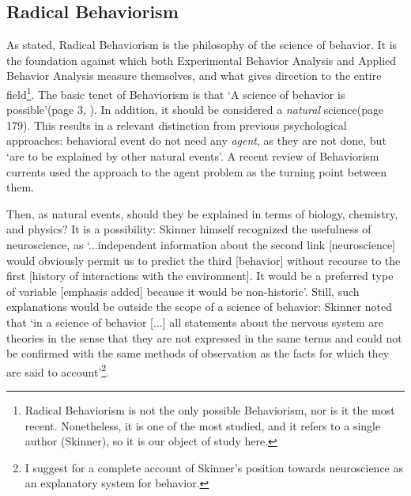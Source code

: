 \documentclass[letterpaper,11pt,twocolumn]{article}
\begin{document}
\subsection*{Radical Behaviorism}
As stated, Radical Behaviorism is the philosophy of the science of behavior. It is the foundation against which both Experimental Behavior Analysis and Applied Behavior Analysis measure themselves, and what gives direction to the entire field\footnote{Radical Behaviorism is not the only possible Behaviorism, nor is it the most recent. Nonetheless, it is one of the most studied, and it refers to a single author (Skinner), so it is our object of study here.}. The basic tenet of Behaviorism is that \enquote*{A science of behavior is possible}(page 3, \cite{baumUnderstandingBehaviorismBehavior2017}). In addition, it should be considered a \textit{natural} science\cite{baumWhatRadicalBehaviorism2011}\cite{chiesaRadicalBehaviorismPhilosophy1994}(page 179). This results in a relevant distinction from previous psychological approaches: behavioral event do not need any \textit{agent}, as they are not done, but \enquote*{are to be explained by other natural events}\cite{baumWhatRadicalBehaviorism2011}.
A recent review\cite{araibaCurrentDiversificationBehaviorism2020} of Behaviorism currents used the approach to the agent problem as the turning point between them.

Then, as natural events, should they be explained in terms of biology, chemistry, and physics? It is a possibility: Skinner himself recognized the usefulness of neuroscience, as \enquote*{...independent information about the second link [neuroscience] would obviously permit us to predict the third [behavior] without recourse to the first [history of interactions with the environment]. It would be a preferred type of variable [emphasis added] because it would be non-historic}\cite{skinnerScienceHumanBehavior1953}.
Still, such explanations would be outside the scope of a science of behavior: Skinner noted that \enquote*{in a science of behavior [...] all statements about the nervous system are theories in the sense that they are not expressed in the same terms and could not be confirmed with the same methods of observation as the facts for which they are said to account}\cite{skinnerAreTheoriesLearning1950}\footnote{I suggest \cite{zilioWhoWhatWhen2016} for a complete account of Skinner's position towards neuroscience as an explanatory system for behavior.}.
\end{document}
